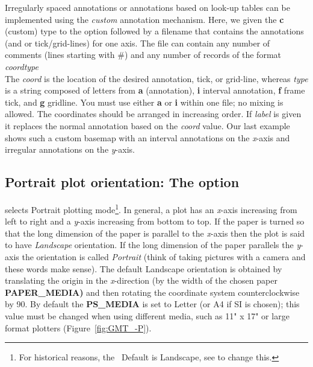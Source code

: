 Irregularly spaced annotations or annotations based on look-up tables can be implemented using
the \emph{custom} annotation mechanism.  Here, we given the {\bf c} (custom) type to the 
option followed by a filename that contains the annotations (and or tick/grid-lines) for one axis.
The file can contain any number of comments (lines starting with \#) and any number of records of
the format
\\
\emph{coord}\quad	\emph{type}
\\
The \emph{coord} is the location of the desired annotation, tick, or grid-line, whereas
\emph{type} is a string composed of letters from {\bf a} (annotation), {\bf i} interval
annotation, {\bf f} frame tick, and {\bf g} gridline.  You must use either {\bf a} or {\bf i}
within one file; no mixing is allowed.  The coordinates should be arranged in increasing order.
If \emph{label} is given it replaces the normal
annotation based on the \emph{coord} value.  Our last example shows such a custom basemap
with an interval annotations on the \emph{x}-axis and irregular annotations on the \emph{y}-axis.



\subsection{Portrait plot orientation: The  option} 


 selects Portrait plotting mode\footnote{For historical reasons, the \GMT\
Default is Landscape, see  to change this.}.  In general,
a plot has an \emph{x}-axis increasing from left to
right and a \emph{y}-axis increasing from bottom to top.  If the
paper is turned so that the long dimension of the paper is
parallel to the \emph{x}-axis then the plot is said to have
\emph{Landscape} orientation.  If the long dimension of
the paper parallels the \emph{y}-axis the orientation is called
\emph{Portrait} (think of taking pictures with a camera
and these words make sense).  The
default Landscape orientation is obtained by translating the origin in the
\emph{x}-direction (by the width of the chosen paper \textbf{PAPER\_MEDIA)} and then rotating the
coordinate system counterclockwise by 90\DS.  By default the \textbf{PS\_MEDIA} is
set to Letter (or A4 if SI is chosen); this value must be changed
when using different media, such as 11" x 17" or large format plotters
(Figure~\ref{fig:GMT_-P}).


